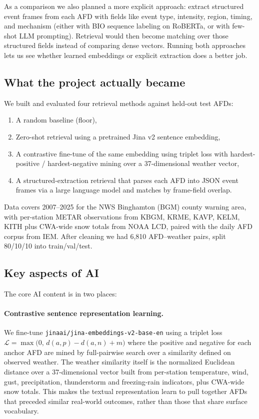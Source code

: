 \documentclass[11pt]{article}
\begin{document}
As a comparison we also planned a more explicit approach: extract structured event frames from each AFD with fields like event type, intensity, region, timing, and mechanism (either with BIO sequence labeling on RoBERTa, or with few-shot LLM prompting). Retrieval would then become matching over those structured fields instead of comparing dense vectors. Running both approaches lets us see whether learned embeddings or explicit extraction does a better job.

\subsection{What the project actually became}
We built and evaluated four retrieval methods against held-out test AFDs:
\begin{enumerate}
  \item A random baseline (floor),
  \item Zero-shot retrieval using a pretrained Jina v2 sentence embedding,
  \item A contrastive fine-tune of the same embedding using triplet loss with hardest-positive / hardest-negative mining over a 37-dimensional weather vector,
  \item A structured-extraction retrieval that parses each AFD into JSON event frames via a large language model and matches by frame-field overlap.
\end{enumerate}


Data covers 2007--2025 for the NWS Binghamton (BGM) county warning area, with per-station METAR observations from KBGM, KRME, KAVP, KELM, KITH plus CWA-wide snow totals from NOAA LCD, paired with the daily AFD corpus from IEM. After cleaning we had 6{,}810 AFD--weather pairs, split 80/10/10 into train/val/test.

\subsection{Key aspects of AI}
The core AI content is in two places:

\paragraph{Contrastive sentence representation learning.}
We fine-tune \texttt{jinaai/jina-embeddings-v2-base-en} using a triplet loss
\(\mathcal{L} = \max\bigl(0,\, d(a,p) - d(a,n) + m\bigr)\)
where the positive and negative for each anchor AFD are mined by full-pairwise search over a similarity defined on observed weather. The weather similarity itself is the normalized Euclidean distance over a 37-dimensional vector built from per-station temperature, wind, gust, precipitation, thunderstorm and freezing-rain indicators, plus CWA-wide snow totals. This makes the textual representation learn to pull together AFDs that preceded similar real-world outcomes, rather than those that share surface vocabulary.
\end{document}
